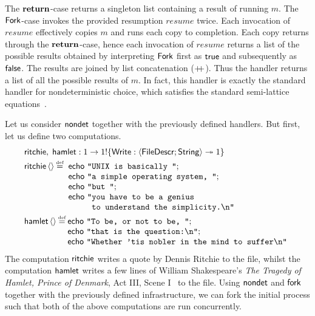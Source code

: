 \documentclass[12pt,phd,lfcs,twoside,openright,logo,leftchapter,normalheadings]{infthesis}
\theoremstyle{plain}
\theoremstyle{definition}
\begin{document}
%
The $\mathbf{return}$-case returns a singleton list containing a result of
running $m$.
%
The $\mathsf{Fork}$-case invokes the provided resumption $resume$ twice. Each
invocation of $resume$ effectively copies $m$ and runs each copy to
completion. Each copy returns through the $\mathbf{return}$-case, hence each
invocation of $resume$ returns a list of the possible results obtained
by interpreting $\mathsf{Fork}$ first as $\mathsf{true}$ and subsequently as
$\mathsf{false}$. The results are joined by list concatenation ($\mathbin{+\!\!+}$).
%
Thus the handler returns a list of all the possible results of $m$.
%
In fact, this handler is exactly the standard handler for
nondeterministic choice, which satisfies the standard semi-lattice
equations~\cite{PlotkinP09,PlotkinP13}.

Let us consider $\mathsf{nondet}$ together with the previously defined
handlers. But first, let us define two computations.
%
\[
  \bl
    \quoteRitchie,\;\quoteHamlet : \UnitType \to \UnitType \eff \{\Write: \Record{\UFD;\String} \opto \UnitType\} \smallskip\\
    \quoteRitchie\,\Unit \defas
      \ba[t]{@{~}l}
        \echo~\strlit{UNIX is basically };\\
        \echo~\strlit{a simple operating system, };\\
        \echo~\strlit{but };\\
        \echo~\texttt{"}
          \ba[t]{@{}l}
             \texttt{you have to be a genius }\\
             \texttt{to understand the simplicity.\nl{}"}
          \ea
      \ea \smallskip\\
    \quoteHamlet\,\Unit \defas
      \ba[t]{@{}l}
        \echo~\strlit{To be, or not to be, };\\
        \echo~\strlit{that is the question:\nl};\\
        \echo~\strlit{Whether 'tis nobler in the mind to suffer\nl}
      \ea
  \el
\]
%
The computation $\mathsf{ritchie}$ writes a quote by Dennis Ritchie to
the file, whilst the computation $\mathsf{hamlet}$ writes a few lines of
William Shakespeare's \emph{The Tragedy of Hamlet, Prince of Denmark},
Act III, Scene I~\cite{Shakespeare6416} to the file.
%
Using $\mathsf{nondet}$ and $\mathsf{fork}$ together with the previously defined
infrastructure, we can fork the initial process such that both of the
above computations are run concurrently.
%
\end{document}
